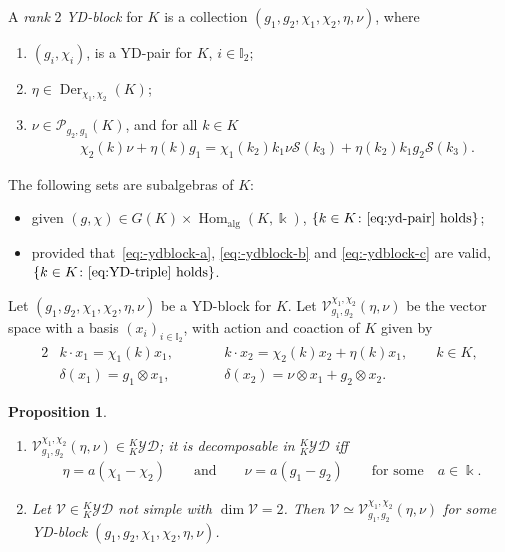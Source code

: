 \documentclass[10pt,a4paper]{amsart}
\numberwithin{equation}{section}
\newtheorem{Proposition}[Theorem]{Proposition}
 { \theoremstyle{definition}
\newtheorem{Definition}[Theorem]{Definition}
\newtheorem{Note}[Theorem]{Note}
\newtheorem{Example}[Theorem]{Example}
\newtheorem{Remark}[Theorem]{Remark} }
\newcommand{\Der}{\operatorname{Der}}
\newcommand{\Hom}{\operatorname{Hom}}
\newcommand{\Pc}{{\mathcal{P}}}
\newcommand{\Ss}{\mathcal{S}}
\newcommand{\Vc}{{\mathcal{V}}}
\newcommand{\I}{{\mathbb I}}
\newcommand{\yd}[1]{{}_{#1}^{#1}\mathcal{YD}}
\begin{document}
\begin{Definition}
A \emph{rank} 2 \emph{YD-block} for $K$ is a collection $(g_1, g_2, \chi_1, \chi_2, \eta, \nu)$,
where{\samepage
\begin{enumerate}[label=$(\alph*)$]\itemsep=0pt
\item\label{eq:-ydblock-a} $(g_i, \chi_i)$, is a YD-pair for $K$, $i \in \I_2$;

\item\label{eq:-ydblock-b} $\eta \in \Der_{\chi_1,\chi_2}(K)$;

\item\label{eq:-ydblock-c} $\nu \in \Pc_{g_2,g_1}(K)$, and for all $k\in K$
\begin{align}\label{eq:YD-triple}
&\chi_2(k) \nu + \eta(k) g_1 = \chi_1(k_2) k_1 \nu \Ss(k_3)
+ \eta(k_2) k_1 g_2 \Ss(k_3).
\end{align}
\end{enumerate}}
\end{Definition}

\begin{Remark} The following sets are subalgebras of $K$:
\begin{itemize}\itemsep=0pt
\item given $(g, \chi) \in G(K) \times \Hom_{\text{alg}}(K, \Bbbk)$, $\{k\in K\colon \eqref{eq:yd-pair} \text{ holds} \}$;

\item provided that~\ref{eq:-ydblock-a}, \ref{eq:-ydblock-b} and \ref{eq:-ydblock-c} are valid, $\{k\in K\colon \eqref{eq:YD-triple} \text{ holds} \}$.
\end{itemize}
\end{Remark}

Let $(g_1, g_2, \chi_1, \chi_2, \eta, \nu)$ be a YD-block for $K$.
Let $\Vc_{g_1, g_2}^{\chi_1, \chi_2}(\eta, \nu)$ be the vector space with a basis $(x_i)_{i\in\I_2}$,
with action and coaction of $K$ given by
\begin{alignat*}{2}
&k\cdot x_1 = \chi_1(k) x_1,\qquad&& k\cdot x_2=\chi_2(k) x_2 + \eta(k)x_{1},\qquad k\in K,
\\
&\delta(x_1) = g_1\otimes x_1, && \delta(x_2) = \nu\otimes x_1 + g_2\otimes x_2.
\end{alignat*}

\begin{Proposition}\quad%
\begin{enumerate}[label=$(\roman*)$]\itemsep=0pt
\item%
$\Vc_{g_1, g_2}^{\chi_1, \chi_2}(\eta, \nu) \in \yd{K}$;
it is decomposable in $\yd{K}$ iff
\begin{gather*}%
\eta = a(\chi_1 - \chi_2)\qquad \text{and}\qquad \nu = a (g_1 - g_2)\qquad
\text{for some} \quad a\in \Bbbk.
\end{gather*}

\item%
Let $\Vc\in \yd{K}$ not simple with $\dim \Vc =2$.
Then $\Vc \simeq \Vc_{g_1, g_2}^{\chi_1, \chi_2}(\eta, \nu)$ for some YD-block $(g_1, g_2, \chi_1, \chi_2, \eta, \nu)$.
\end{enumerate}
\end{Proposition}
\end{document}
